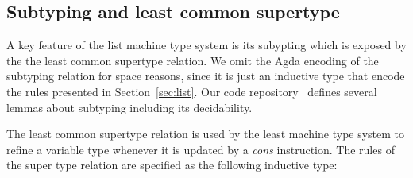 \documentclass[sigconf]{acmart}
\theoremstyle{definition}
\begin{document}
\subsection{Subtyping and least common supertype}\label{sec:supertype}


A key feature of the list machine type system is its subypting which is exposed by the
the least common supertype relation. We omit the Agda encoding of the subtyping relation for
space reasons, since it is just an inductive type that encode the rules presented
in Section~\ref{sec:list}. Our code repository~\cite{list-rep} defines several lemmas about
subtyping including its decidability.

The least common supertype relation is used by the least machine type system to refine a
variable type whenever it is updated by a \emph{cons} instruction. The rules of the
super type relation are specified as the following inductive type:
\end{document}
